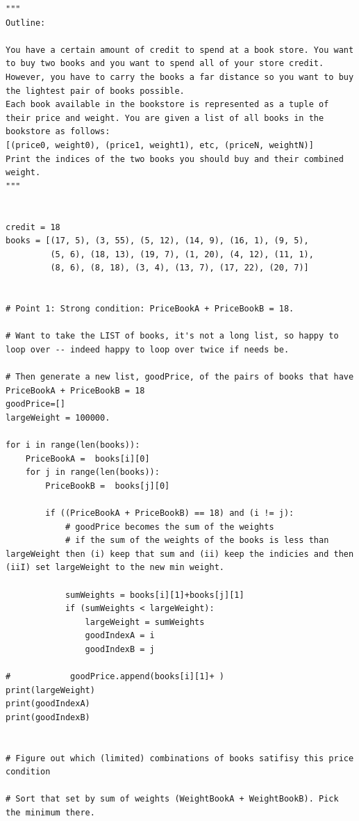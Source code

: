 \documentclass[11pt,a4paper]{article}
\begin{document}
\begin{lstlisting}
"""
Outline:

You have a certain amount of credit to spend at a book store. You want to buy two books and you want to spend all of your store credit. However, you have to carry the books a far distance so you want to buy the lightest pair of books possible.
Each book available in the bookstore is represented as a tuple of their price and weight. You are given a list of all books in the bookstore as follows:
[(price0, weight0), (price1, weight1), etc, (priceN, weightN)]
Print the indices of the two books you should buy and their combined weight.
"""
    
    
credit = 18
books = [(17, 5), (3, 55), (5, 12), (14, 9), (16, 1), (9, 5),
         (5, 6), (18, 13), (19, 7), (1, 20), (4, 12), (11, 1),
         (8, 6), (8, 18), (3, 4), (13, 7), (17, 22), (20, 7)]


# Point 1: Strong condition: PriceBookA + PriceBookB = 18. 

# Want to take the LIST of books, it's not a long list, so happy to loop over -- indeed happy to loop over twice if needs be. 

# Then generate a new list, goodPrice, of the pairs of books that have PriceBookA + PriceBookB = 18
goodPrice=[]
largeWeight = 100000.

for i in range(len(books)):
    PriceBookA =  books[i][0] 
    for j in range(len(books)):
        PriceBookB =  books[j][0] 
        
        if ((PriceBookA + PriceBookB) == 18) and (i != j):
            # goodPrice becomes the sum of the weights 
            # if the sum of the weights of the books is less than largeWeight then (i) keep that sum and (ii) keep the indicies and then (iiI) set largeWeight to the new min weight. 
            
            sumWeights = books[i][1]+books[j][1]
            if (sumWeights < largeWeight):
                largeWeight = sumWeights
                goodIndexA = i     
                goodIndexB = j            
        
#            goodPrice.append(books[i][1]+ )
print(largeWeight) 
print(goodIndexA)
print(goodIndexB)


# Figure out which (limited) combinations of books satifisy this price condition

# Sort that set by sum of weights (WeightBookA + WeightBookB). Pick the minimum there. 

\end{lstlisting}
\end{document}
